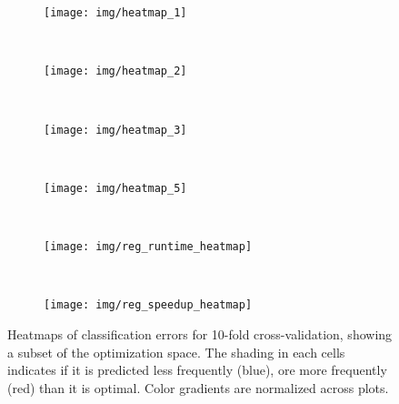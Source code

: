   \begin{figure}
    \centering
    \begin{subfigure}[t]{0.28\columnwidth}
      \centering
      \texttt{[image: img/heatmap\_1]}
      \vspace{-1.5em} %
      \caption{}
      \label{fig:class-hmaps-1}
    \end{subfigure}
    ~%
    \begin{subfigure}[t]{0.28\columnwidth}
      \centering
      \texttt{[image: img/heatmap\_2]}
      \vspace{-1.5em} %
      \caption{}
      \label{fig:class-hmaps-2}
    \end{subfigure}
    ~%
    \begin{subfigure}[t]{0.28\columnwidth}
      \centering
      \texttt{[image: img/heatmap\_3]}
      \vspace{-1.5em} %
      \caption{}
      \label{fig:class-hmaps-3}
    \end{subfigure}
    \\
    \begin{subfigure}[t]{0.28\columnwidth}
      \centering
      \texttt{[image: img/heatmap\_5]}
      \vspace{-1.5em} %
      \caption{}
      \label{fig:class-hmaps-4}
    \end{subfigure}
    ~%
    \begin{subfigure}[t]{0.28\columnwidth}
      \centering
      \texttt{[image: img/reg\_runtime\_heatmap]}
      \vspace{-1.5em} %
      \caption{}
      \label{fig:class-hmaps-5}
    \end{subfigure}
    ~%
    \begin{subfigure}[t]{0.28\columnwidth}
      \centering
      \texttt{[image: img/reg\_speedup\_heatmap]}
      \vspace{-1.5em} %
      \caption{}
      \label{fig:class-hmaps-6}
    \end{subfigure}
    \caption[Classification error heatmaps]{%
    Heatmaps of classification errors for 10-fold cross-validation,
    showing a subset of the optimization space. The shading in each
    cells indicates if it is predicted less frequently (blue), ore more
    frequently (red) than it is optimal. Color gradients are normalized
    across plots.%
    }
    \label{fig:class-hmaps}
  \end{figure}


